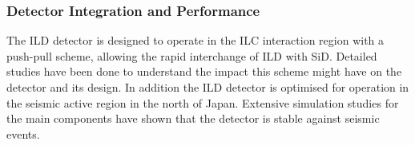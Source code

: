 \subsubsection{Detector Integration and Performance}
The ILD detector is designed to operate in the ILC interaction region with a push-pull scheme, allowing the rapid interchange of ILD with SiD. Detailed studies have been done to understand the impact this scheme might have on the detector and its design. In addition the ILD detector is optimised for operation in the seismic active region in the north of Japan. Extensive simulation studies for the main components have shown that the detector is stable against seismic events. 










